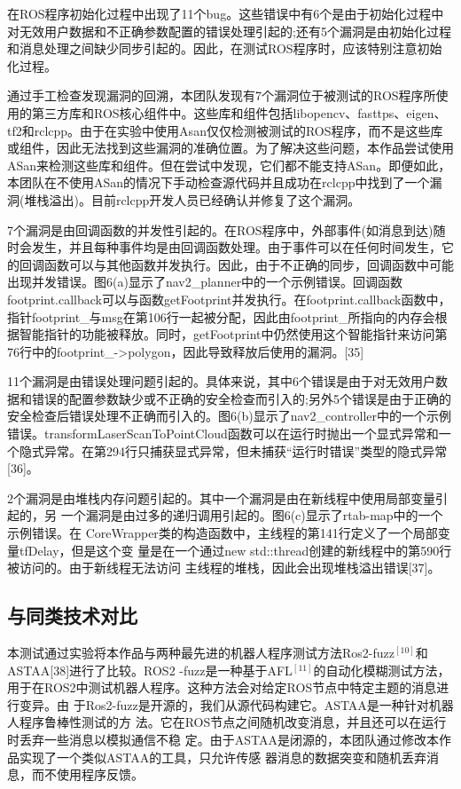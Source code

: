 在ROS程序初始化过程中出现了11个bug。这些错误中有6个是由于初始化过程中对无效用户数据和不正确参数配置的错误处理引起的;还有5个漏洞是由初始化过程和消息处理之间缺少同步引起的。因此，在测试ROS程序时，应该特别注意初始化过程。

通过手工检查发现漏洞的回溯，本团队发现有7个漏洞位于被测试的ROS程序所使用的第三方库和ROS核心组件中。这些库和组件包括libopencv、fasttps、eigen、tf2和rclcpp。由于在实验中使用Asan仅仅检测被测试的ROS程序，而不是这些库或组件，因此无法找到这些漏洞的准确位置。为了解决这些问题，本作品尝试使用ASan来检测这些库和组件。但在尝试中发现，它们都不能支持ASan。即便如此，本团队在不使用ASan的情况下手动检查源代码并且成功在rclcpp中找到了一个漏洞(堆栈溢出)。目前rclcpp开发人员已经确认并修复了这个漏洞。

7个漏洞是由回调函数的并发性引起的。在ROS程序中，外部事件(如消息到达)随时会发生，并且每种事件均是由回调函数处理。由于事件可以在任何时间发生，它的回调函数可以与其他函数并发执行。因此，由于不正确的同步，回调函数中可能出现并发错误。图6(a)显示了nav2\_planner中的一个示例错误。回调函数footprint.callback可以与函数getFootprint并发执行。在footprint.callback函数中，指针footprint\_与msg在第106行一起被分配，因此由footprint\_所指向的内存会根据智能指针的功能被释放。同时，getFootprint中仍然使用这个智能指针来访问第76行中的footprint\_-\textgreater polygon，因此导致释放后使用的漏洞。{[}35{]}

11个漏洞是由错误处理问题引起的。具体来说，其中6个错误是由于对无效用户数据和错误的配置参数缺少或不正确的安全检查而引入的;另外5个错误是由于正确的安全检查后错误处理不正确而引入的。图6(b)显示了nav2\_controller中的一个示例错误。transformLaserScanToPointCloud函数可以在运行时抛出一个显式异常和一个隐式异常。在第294行只捕获显式异常，但未捕获``运行时错误''类型的隐式异常{[}36{]}。

2个漏洞是由堆栈内存问题引起的。其中一个漏洞是由在新线程中使用局部变量引起的，另
一个漏洞是由过多的递归调用引起的。图6(c)显示了rtab-map中的一个示例错误。在
CoreWrapper类的构造函数中，主线程的第141行定义了一个局部变量tfDelay，但是这个变
量是在一个通过new std::thread创建的新线程中的第590行被访问的。由于新线程无法访问
主线程的堆栈，因此会出现堆栈溢出错误{[}37{]}。

\subsection{与同类技术对比}
本测试通过实验将本作品与两种最先进的机器人程序测试方法Ros2-fuzz$^{[10]}$和
ASTAA{[}38{]}进行了比较。ROS2 -fuzz是一种基于AFL$^{[11]}$的自动化模糊测试方法，
用于在ROS2中测试机器人程序。这种方法会对给定ROS节点中特定主题的消息进行变异。由
于Ros2-fuzz是开源的，我们从源代码构建它。ASTAA是一种针对机器人程序鲁棒性测试的方
法。它在ROS节点之间随机改变消息，并且还可以在运行时丢弃一些消息以模拟通信不稳
定。由于ASTAA是闭源的，本团队通过修改本作品实现了一个类似ASTAA的工具，只允许传感
器消息的数据突变和随机丢弃消息，而不使用程序反馈。

